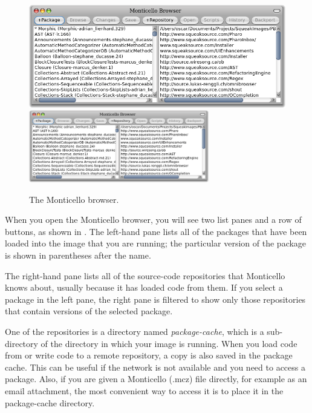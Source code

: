 \documentclass[a4paper,10pt,twoside]{book}
\begin{document}
\begin{figure}[btp]
	\begin{center}
	\ifluluelse
		{\includegraphics[width=\textwidth]{freshMonticello}}
		{\includegraphics[width=0.7\textwidth]{freshMonticello}}
	\end{center}
	\caption{The Monticello browser.}
\end{figure}

When you open the Monticello browser, you will see two list panes and a row of buttons, as shown in .
The left-hand pane lists all of the packages that have been loaded into the image that you are running; the particular version of the package is shown in parentheses after the name.

The right-hand pane lists all of the source-code repositories that Monticello knows about, usually because it has loaded code from them.  If you select a package in the left pane, the right pane is filtered to show only those repositories that contain versions of the selected package.

One of the repositories is a directory named \emph{package-cache}, which is a sub-directory of the directory in which your image is running.  
When you load code from or write code to a remote repository, a copy is also saved in the package cache.  This can be useful if the network is not available and you need to access a package.  Also, if you are given a Monticello (.mcz) file directly, for example as an email attachment, the most convenient way to access it is to place it in the package-cache directory.
\end{document}
